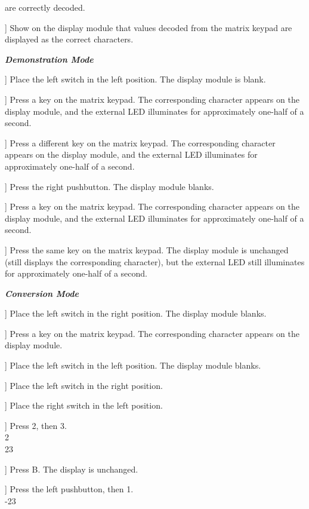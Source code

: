 \begin{description}
    are correctly decoded.
\item [[ ]] Show on the display module that values decoded from the matrix
    keypad are displayed as the correct characters.
\item[] \textbf{\textit{Demonstration Mode}}
\item[[ ]] Place the left switch in the left position. The display module is
    blank.
\item[[ ]] Press a key on the matrix keypad. The corresponding character
    appears on the display module, and the external LED illuminates for
    approximately one-half of a second.
\item[[ ]] Press a different key on the matrix keypad. The corresponding
    character appears on the display module, and the external LED illuminates
    for approximately one-half of a second.
\item[[ ]] Press the right pushbutton. The display module blanks.
\item[[ ]] Press a key on the matrix keypad. The corresponding character
    appears on the display module, and the external LED illuminates for
    approximately one-half of a second.
\item[[ ]] Press the same key on the matrix keypad. The display module is
    unchanged (still displays the corresponding character), but the external
    LED still illuminates for approximately one-half of a second.
\item[] \textbf{\textit{Conversion Mode}}
\item[[ ]] Place the left switch in the right position. The display module
    blanks.
\item[[ ]] Press a key on the matrix keypad. The corresponding character
    appears on the display module.
\item[[ ]] Place the left switch in the left position. The display module
    blanks.
\item[[ ]] Place the left switch in the right position.
\item[[ ]] Place the right switch in the left position.
\item[[ ]] Press 2, then 3. \\
    {\dviiseg \phantom{8888888}2} \\
    {\dviiseg \phantom{888888}23}
\item[[ ]] Press B. The display is unchanged.
\item[[ ]] Press the left pushbutton, then 1. \\
    {\dviiseg -\phantom{88888}23} \\

\end{description}
